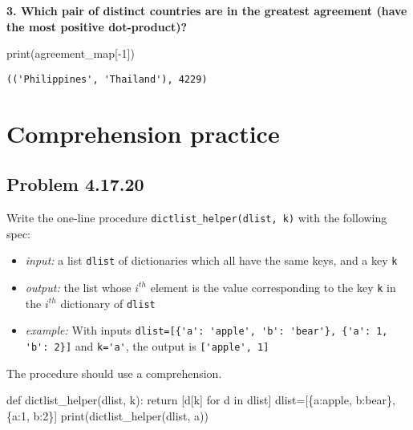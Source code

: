 \documentclass[
  letterpaper,
  DIV=11,
  numbers=noendperiod]{scrartcl}
\newenvironment{Shaded}{\begin{snugshade}}{\end{snugshade}}
\newcommand{\BuiltInTok}[1]{\textcolor[rgb]{0.00,0.23,0.31}{#1}}
\newcommand{\ControlFlowTok}[1]{\textcolor[rgb]{0.00,0.23,0.31}{#1}}
\newcommand{\DecValTok}[1]{\textcolor[rgb]{0.68,0.00,0.00}{#1}}
\newcommand{\KeywordTok}[1]{\textcolor[rgb]{0.00,0.23,0.31}{#1}}
\newcommand{\NormalTok}[1]{\textcolor[rgb]{0.00,0.23,0.31}{#1}}
\newcommand{\OperatorTok}[1]{\textcolor[rgb]{0.37,0.37,0.37}{#1}}
\newcommand{\StringTok}[1]{\textcolor[rgb]{0.13,0.47,0.30}{#1}}
\begin{document}
\textbf{3. Which pair of distinct countries are in the greatest
agreement (have the most positive dot-product)?}

\begin{Shaded}
\begin{Highlighting}[numbers=left,,]
\BuiltInTok{print}\NormalTok{(agreement\_map[}\OperatorTok{{-}}\DecValTok{1}\NormalTok{])}
\end{Highlighting}
\end{Shaded}

\begin{verbatim}
(('Philippines', 'Thailand'), 4229)
\end{verbatim}

\newpage{}

\hypertarget{comprehension-practice}{%
\section{Comprehension practice}\label{comprehension-practice}}

\hypertarget{problem-4.17.20}{%
\subsection{Problem 4.17.20}\label{problem-4.17.20}}

Write the one-line procedure \texttt{dictlist\_helper(dlist,\ k)} with
the following spec:\\

\begin{itemize}
\item \textit{input:} a list \verb|dlist| of dictionaries which all have the same keys, and a key \verb|k|
\item \textit{output:} the list whose $i^{th}$ element is the value corresponding to the key \verb|k| in the $i^{th}$ dictionary of \verb|dlist|
\item \textit{example:} With inputs \verb|dlist=[{'a': 'apple', 'b': 'bear'}, {'a': 1, 'b': 2}]| and \verb|k='a'|, the output is \verb|['apple', 1]|
\end{itemize}

The procedure should use a comprehension.

\begin{Shaded}
\begin{Highlighting}[numbers=left,,]
\KeywordTok{def}\NormalTok{ dictlist\_helper(dlist, k):}
  \ControlFlowTok{return}\NormalTok{ [d[k] }\ControlFlowTok{for}\NormalTok{ d }\KeywordTok{in}\NormalTok{ dlist]}
\NormalTok{dlist}\OperatorTok{=}\NormalTok{[\{}\StringTok{\textquotesingle{}a\textquotesingle{}}\NormalTok{:}\StringTok{\textquotesingle{}apple\textquotesingle{}}\NormalTok{, }\StringTok{\textquotesingle{}b\textquotesingle{}}\NormalTok{:}\StringTok{\textquotesingle{}bear\textquotesingle{}}\NormalTok{\}, \{}\StringTok{\textquotesingle{}a\textquotesingle{}}\NormalTok{:}\DecValTok{1}\NormalTok{, }\StringTok{\textquotesingle{}b\textquotesingle{}}\NormalTok{:}\DecValTok{2}\NormalTok{\}]}
\BuiltInTok{print}\NormalTok{(dictlist\_helper(dlist, }\StringTok{\textquotesingle{}a\textquotesingle{}}\NormalTok{))}
\end{Highlighting}
\end{Shaded}
\end{document}
